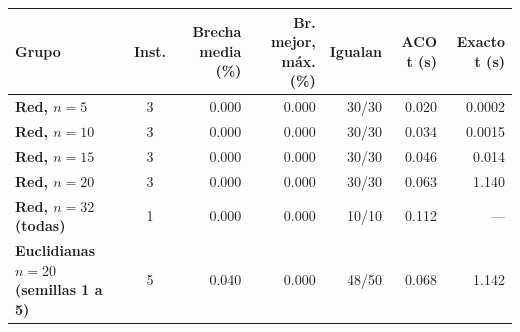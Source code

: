 \renewcommand{\arraystretch}{1.2}
\begin{tabular}{|l|c|r|r|r|r|r|}
\hline
\rowcolor{gray!20} \textbf{Grupo} & \textbf{Inst.} & \textbf{Brecha media (\%)} & \textbf{Br. mejor, máx. (\%)} & \textbf{Igualan} & \textbf{ACO t (s)} & \textbf{Exacto t (s)} \\
\hline
\textbf{Red, $n=5$} & 3 & 0.000 & 0.000 & 30/30 & 0.020 & 0.0002 \\
\hline
\textbf{Red, $n=10$} & 3 & 0.000 & 0.000 & 30/30 & 0.034 & 0.0015 \\
\hline
\textbf{Red, $n=15$} & 3 & 0.000 & 0.000 & 30/30 & 0.046 & 0.014 \\
\hline
\textbf{Red, $n=20$} & 3 & 0.000 & 0.000 & 30/30 & 0.063 & 1.140 \\
\hline
\textbf{Red, $n=32$ (todas)} & 1 & 0.000 & 0.000 & 10/10 & 0.112 & --- \\
\hline
\textbf{Euclidianas $n=20$ (semillas 1 a 5)} & 5 & 0.040 & 0.000 & 48/50 & 0.068 & 1.142 \\
\hline
\end{tabular}
